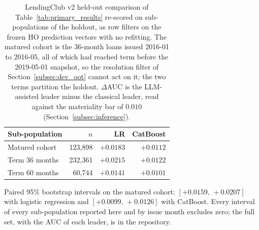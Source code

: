 \documentclass[final,5p,twocolumn]{elsarticle}
\begin{document}
\begin{table}[htbp]
\centering
\footnotesize
\begin{threeparttable}
\caption{LendingClub v2 held-out comparison of Table~\ref{tab:primary_results} re-scored on sub-populations of the holdout, as row filters on the frozen HO prediction vectors with no refitting. The matured cohort is the 36-month loans issued 2016-01 to 2016-05, all of which had reached term before the 2019-05-01 snapshot, so the resolution filter of Section~\ref{subsec:dev_oot} cannot act on it; the two terms partition the holdout. $\Delta$AUC is the LLM-assisted leader minus the classical leader, read against the materiality bar of $0.010$ (Section~\ref{subsec:inference}).}
\label{tab:lc_maturity}
\setlength{\tabcolsep}{5pt}
\begin{tabular}{@{}lrrr@{}}
\toprule
Sub-population & $n$ & LR & CatBoost \\
\midrule
Matured cohort\tnote{a} & 123,898 & $+0.0183$ & $+0.0112$ \\
Term 36 months & 232,361 & $+0.0215$ & $+0.0122$ \\
Term 60 months & 60,744 & $+0.0141$ & $+0.0101$ \\
\bottomrule
\end{tabular}
\begin{tablenotes}\footnotesize
\item[a] Paired 95\% bootstrap intervals on the matured cohort: $[+0.0159,\,+0.0207]$ with logistic regression and $[+0.0099,\,+0.0126]$ with CatBoost. Every interval of every sub-population reported here and by issue month excludes zero; the full set, with the AUC of each leader, is in the repository.
\end{tablenotes}
\end{threeparttable}
\end{table}
\end{document}
